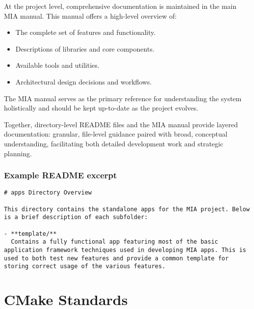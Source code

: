 At the project level, comprehensive documentation is maintained in the main MIA manual. This manual offers a high-level overview of:
\begin{itemize}
    \item The complete set of features and functionality.
    \item Descriptions of libraries and core components.
    \item Available tools and utilities.
    \item Architectural design decisions and workflows.
\end{itemize}
The MIA manual serves as the primary reference for understanding the system holistically and should be kept up-to-date as the project evolves.

Together, directory-level README files and the MIA manual provide layered documentation: granular, file-level guidance paired with broad, conceptual understanding, facilitating both detailed development work and strategic planning.

\subsubsection*{Example README excerpt}

\begin{lstlisting}[style=cppstyle]
# apps Directory Overview

This directory contains the standalone apps for the MIA project. Below is a brief description of each subfolder:
  
- **template/**  
  Contains a fully functional app featuring most of the basic application framework techniques used in developing MIA apps. This is used to both test new features and provide a common template for storing correct usage of the various features.
\end{lstlisting}









\section{CMake Standards}


